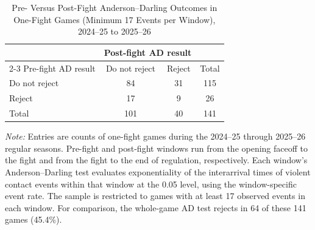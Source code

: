 \begin{table}[htbp]
\centering
\caption{Pre- Versus Post-Fight Anderson--Darling Outcomes in One-Fight Games (Minimum 17 Events per Window), 2024--25 to 2025--26}
\label{tab:one_fight_AD_rejection_min_17_20242025_20252026}
\small
\renewcommand{\arraystretch}{1.15}
\setlength{\tabcolsep}{6pt}

\begin{tabular*}{0.78\textwidth}{@{\extracolsep{\fill}}lccc}
\toprule
 & \multicolumn{2}{c}{Post-fight AD result} & \\
\cmidrule(lr){2-3}
Pre-fight AD result & Do not reject & Reject & Total \\
\midrule
Do not reject & 84 & 31 & 115 \\
Reject & 17 & 9 & 26 \\
\midrule
Total & 101 & 40 & 141 \\
\bottomrule
\end{tabular*}

\vspace{0.4em}
\parbox{0.78\textwidth}{
\footnotesize
\textit{Note:} Entries are counts of one-fight games during the 2024--25 through 2025--26 regular seasons. Pre-fight and post-fight windows run from the opening faceoff to the fight and from the fight to the end of regulation, respectively. Each window's Anderson--Darling test evaluates exponentiality of the interarrival times of violent contact events within that window at the 0.05 level, using the window-specific event rate. The sample is restricted to games with at least 17 observed events in each window. For comparison, the whole-game AD test rejects in 64 of these 141 games (45.4\%).
}
\end{table}
